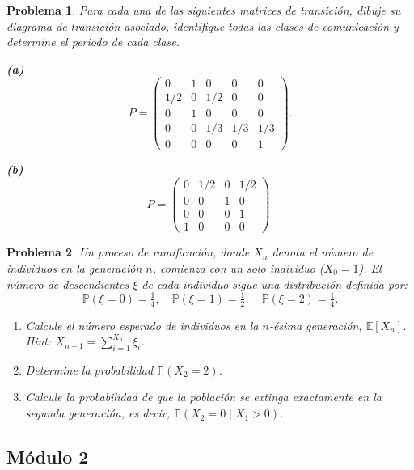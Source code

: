 \documentclass[12pt]{article}
\newtheorem{problem}{Problema}
\begin{document}
\begin{problem}
Para cada una de las siguientes matrices de transición, dibuje su diagrama de transición asociado, identifique todas las clases de comunicación y determine el periodo de cada clase.

\noindent\textbf{(a)}
\[
P = \begin{pmatrix}
0   & 1   & 0   & 0   & 0   \\[3pt]
1/2 & 0   & 1/2 & 0   & 0   \\[3pt]
0   & 1   & 0   & 0   & 0   \\[3pt]
0   & 0   & 1/3 & 1/3 & 1/3 \\[3pt]
0   & 0   & 0   & 0   & 1
\end{pmatrix}.
\]

\noindent\textbf{(b)}
\[
P = \begin{pmatrix}
0   & 1/2 & 0   & 1/2 \\[3pt]
0   & 0   & 1   & 0   \\[3pt]
0   & 0   & 0   & 1   \\[3pt]
1   & 0   & 0   & 0
\end{pmatrix}.
\]
\end{problem}

\begin{problem}
Un proceso de ramificación, donde $X_n$ denota el número de individuos en la generación $n$, comienza con un solo individuo ($X_0 = 1$). El número de descendientes $\xi$ de cada individuo sigue una distribución definida por:
\[
    \mathbb{P}(\xi = 0) = \tfrac{1}{4}, \quad
    \mathbb{P}(\xi = 1) = \tfrac{1}{2}, \quad
    \mathbb{P}(\xi = 2) = \tfrac{1}{4}.
\]
\begin{enumerate}
    \item[(a)] Calcule el número esperado de individuos en la $n$-ésima generación, $\mathbb{E}[X_n]$. \textit{Hint:} $X_{n+1} = \sum_{i=1}^{X_n} \xi_i$.
    \item[(b)] Determine la probabilidad $\mathbb{P}(X_2 = 2)$.
    \item[(c)] Calcule la probabilidad de que la población se extinga exactamente en la segunda generación, es decir, $\mathbb{P}(X_2 = 0 \mid X_1 > 0)$.
\end{enumerate}
\end{problem}


\subsection*{Módulo 2}
\end{document}
